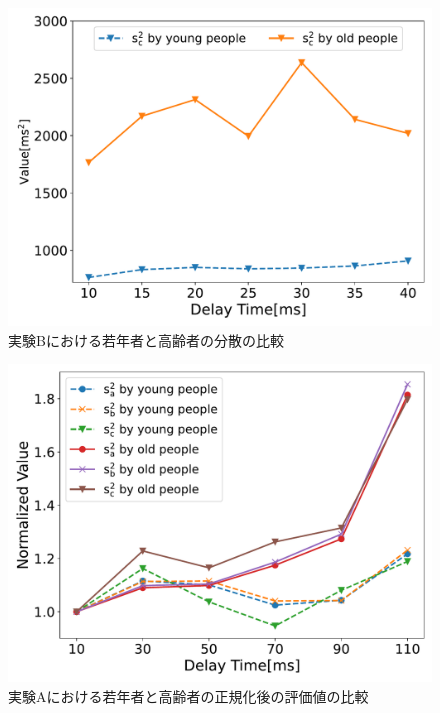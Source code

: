 \begin{figure}[tbp]
  \centering
  \includegraphics[scale=0.5]{figures/Honbann/Comparison_young_old/40_var_Sc.pdf}
  \caption{実験Bにおける若年者と高齢者の分散の比較}
  \label{fig:Var_40ms_Sc}
\end{figure}

\begin{figure}[tbp]
  \centering
  \includegraphics[scale=0.5]{figures/Honbann/Comparison_young_old/110_var_normalized.pdf}
  \caption{実験Aにおける若年者と高齢者の正規化後の評価値の比較}
  \label{fig:Normalized-Var_110ms_SaSbSc}
\end{figure}

